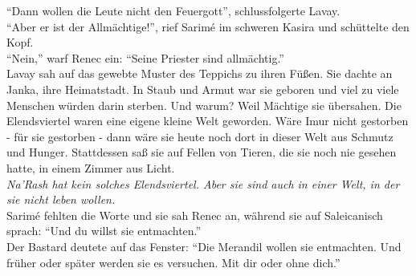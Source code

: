 ``Dann wollen die Leute nicht den Feuergott'', schlussfolgerte Lavay.\\
``Aber er ist der Allmächtige!'', rief Sarimé im schweren Kasira und schüttelte den Kopf.\\
``Nein,'' warf Renec ein: ``Seine Priester sind allmächtig.''\\
Lavay sah auf das gewebte Muster des Teppichs zu ihren Füßen. Sie dachte an Janka, ihre 
Heimatstadt. In Staub und Armut war sie geboren und viel zu viele Menschen würden darin sterben. 
Und warum? Weil Mächtige sie übersahen. Die Elendsviertel waren eine eigene kleine Welt geworden. 
Wäre Imur nicht gestorben - für sie gestorben - dann wäre sie heute noch dort in 
dieser Welt aus Schmutz und Hunger. Stattdessen saß sie auf Fellen von Tieren, die sie noch nie gesehen hatte, in einem Zimmer aus Licht.\\
\textit{Na'Rash hat kein solches Elendsviertel. Aber sie sind auch in einer Welt, in der sie nicht leben 
wollen.}\\
Sarimé fehlten die Worte und sie sah Renec an, während sie auf Saleicanisch sprach: ``Und du willst 
sie entmachten.''\\
Der Bastard deutete auf das Fenster: ``Die Merandil wollen sie entmachten. Und früher oder später 
werden sie es versuchen. Mit dir oder ohne dich.''\\

